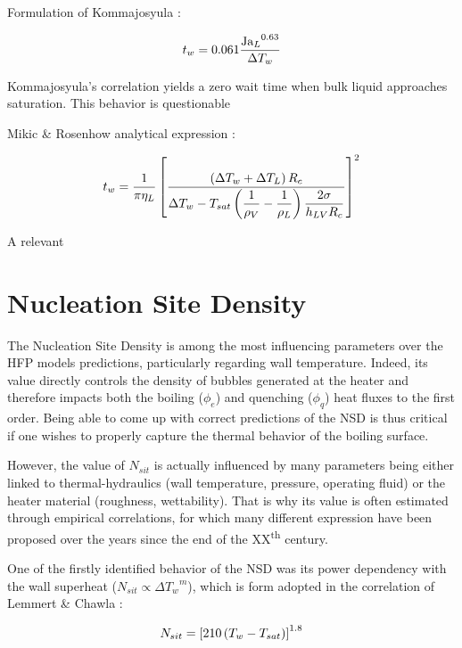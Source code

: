 Formulation of Kommajosyula \cite{Komma}:

\begin{equation}
t_{w} = 0.061\frac{{\mathrm{Ja}_{L}}^{0.63}}{\Delta T_{w}}
\end{equation}

\begin{remark*}
Kommajosyula's correlation yields a zero wait time when bulk liquid approaches saturation. This behavior is questionable 
\end{remark*}

Mikic \& Rosenhow analytical expression \cite{mikic}:

\begin{align}
t_{w} = \frac{1}{\pi \eta_{L}}\left[  \frac{\left( \Delta T_{w}+ \Delta T_{L} \right)R_{c}}{\Delta T_{w} - T_{sat} \left( \dfrac{1}{\rho_{V}}-\dfrac{1}{\rho_{L}} \right) \dfrac{2\sigma}{h_{LV}R_{c}} }  \right]^{2}
\end{align}

A relevant


\section{Nucleation Site Density}

The Nucleation Site Density is among the most influencing parameters over the HFP models predictions, particularly regarding wall temperature. Indeed, its value directly controls the density of bubbles generated at the heater and therefore impacts both the boiling ($\phi_{e}$) and quenching ($\phi_{q}$) heat fluxes to the first order. Being able to come up with correct predictions of the NSD is thus critical if one wishes to properly capture the thermal behavior of the boiling surface.

However, the value of $N_{sit}$ is actually influenced by many parameters being either linked to thermal-hydraulics (wall temperature, pressure, operating fluid) or the heater material (roughness, wettability). That is why its value is often estimated through empirical correlations, for which many different expression have been proposed over the years since the end of the XX\textsuperscript{th} century.

\npar

One of the firstly identified behavior of the NSD was its power dependency with the wall superheat ($N_{sit} \propto {\Delta T_{w}}^{m}$), which is form adopted in the correlation of Lemmert \& Chawla \cite{Lemmert} : 

\begin{align}
N_{sit}=\left[ 210\left( T_{w}-T_{sat} \right) \right]^{1.8}
\label{eq:nsit_lemmert}
\end{align}

